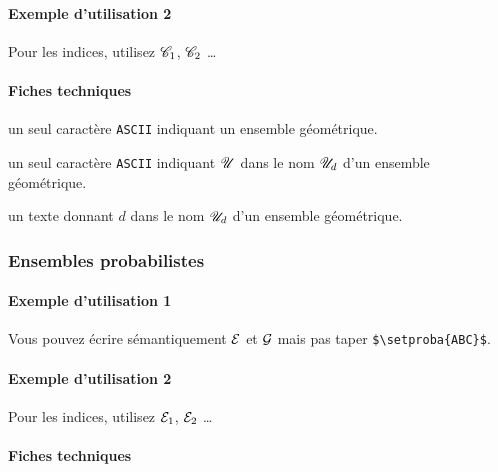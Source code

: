 \documentclass[12pt,a4paper]{article}
\theoremstyle{definition}
\newcommand\ascii{\texttt{ASCII}}
\begin{document}
\paragraph{Exemple d'utilisation 2}

\begin{tcblisting}{}
Pour les indices, utilisez $\setgeo*{C}{1}$, $\setgeo*{C}{2}$ \dots
\end{tcblisting}


\paragraph{Fiches techniques}


\IDarg{} un seul caractère \ascii{} indiquant un ensemble géométrique.


\bigskip



 un seul caractère \ascii{} indiquant $\setgeo{U}$ dans le nom $\setgeo*{U}{d}$ d'un ensemble géométrique.

 un texte donnant $d$ dans le nom $\setgeo*{U}{d}$ d'un ensemble géométrique.



\subsubsection{Ensembles probabilistes}

\paragraph{Exemple d'utilisation 1}

\begin{tcblisting}{}
Vous pouvez écrire sémantiquement $\setproba{E}$ et $\setproba{G}$ mais pas taper
\verb+$\setproba{ABC}$+.
\end{tcblisting}


\paragraph{Exemple d'utilisation 2}

\begin{tcblisting}{}
Pour les indices, utilisez $\setproba*{E}{1}$, $\setproba*{E}{2}$ \dots
\end{tcblisting}


\paragraph{Fiches techniques}
\end{document}
